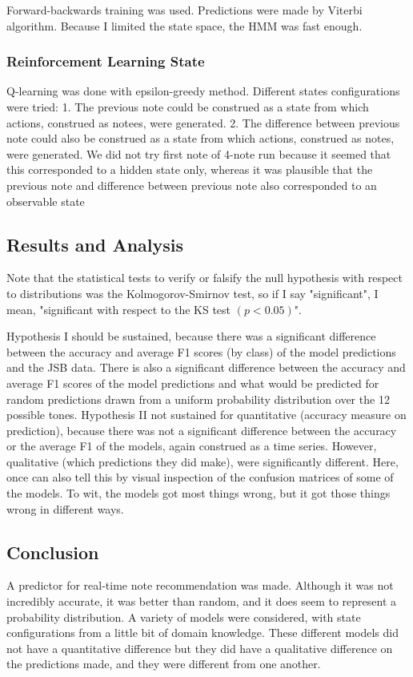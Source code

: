 \documentclass{article}
\begin{document}
Forward-backwards training was used. Predictions were made by Viterbi algorithm. Because I limited the state space, the HMM was fast enough. %

\subsubsection*{Reinforcement Learning State}
Q-learning was done with epsilon-greedy method. Different states configurations were tried:
1. The previous note could be construed as a state from which actions, construed as notees, were generated.
2. The difference between previous note could also be construed as a state from which actions, construed as notes, were generated.
We did not try first note of 4-note run because it seemed that this corresponded to a hidden state only, whereas it was plausible that the previous note and difference between previous note also corresponded to an observable state

\subsection*{Results and Analysis}
Note that the statistical tests to verify or falsify the null hypothesis with respect to distributions was the Kolmogorov-Smirnov test, so if I say "significant", I mean, "significant with respect to the KS test $(p<0.05)$".

Hypothesis I should be sustained, because there was a significant difference between the accuracy and average F1 scores (by class) of the model predictions and the JSB data. There is also a significant difference between the accuracy and average F1 scores of the model predictions and what would be predicted for random predictions drawn from a uniform probability distribution over the 12 possible tones.
Hypothesis II not sustained for quantitative (accuracy measure on prediction), because there was not a significant difference between the accuracy or the average F1 of the models, again construed as a time series.
However, qualitative (which predictions they did make), were significantly different. Here, once can also tell this by visual inspection of the confusion matrices of some of the models. To wit, the models got most things wrong, but it got those things wrong in different ways.


\subsection*{Conclusion}
A predictor for real-time note recommendation was made.
Although it was not incredibly accurate, it was better than random, and it does seem to represent a probability distribution.
A variety of models were considered, with state configurations from a little bit of domain knowledge.
These different models did not have a quantitative difference but they did have a qualitative difference on the predictions made, and they were different from one another.
\end{document}
